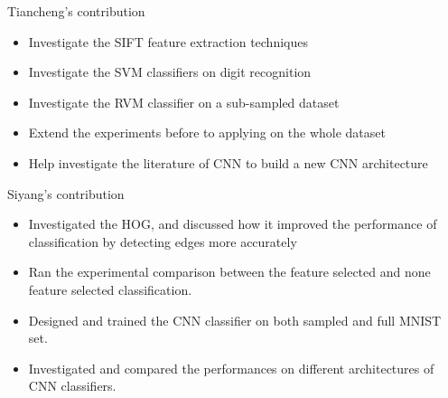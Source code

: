 \documentclass[12pt]{article}
\newenvironment{nscenter}
 {\parskip=0pt\par\nopagebreak\centering}
 {\par\noindent\ignorespacesafterend}
\begin{document}




\newpage
\begin{nscenter}
\Large{Tiancheng's contribution}
\end{nscenter}
\begin{itemize}
\item Investigate the SIFT feature extraction techniques 
\item Investigate the SVM classifiers on digit recognition
\item Investigate the RVM classifier on a sub-sampled dataset
\item Extend the experiments before to applying on the whole dataset
\item Help investigate the literature of CNN to build a new CNN architecture
\end{itemize}

\newpage
\begin{nscenter}
\Large{Siyang's contribution}
\end{nscenter}
\begin{itemize}
\item Investigated the HOG, and discussed how it improved the performance of classification by detecting edges more accurately
\item Ran the experimental comparison between the feature selected and none feature selected classification.
\item Designed and trained the CNN classifier on both sampled and full MNIST set.
\item Investigated and compared the performances on different architectures of CNN classifiers.
\end{itemize}



\end{document}
